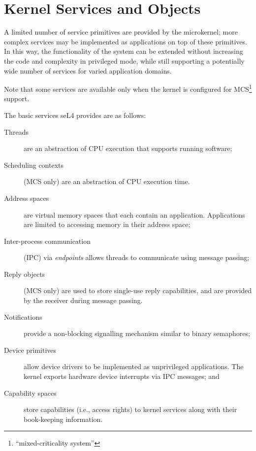 %
%
%

\chapter{\label{ch:objects}Kernel Services and Objects}

A limited number of service primitives are provided by the microkernel;
more complex services may be implemented as applications on top of these
primitives. In this way, the functionality of the system can be extended
without increasing the code and complexity in privileged mode, while
still supporting a potentially wide number of services for varied
application domains.

Note that some services are available only when the kernel is configured for
MCS\footnote{``mixed-criticality system''} support.

The basic services seL4 provides are as follows:
\begin{description}
    \item[Threads] are an abstraction of CPU execution that supports
    running software;

    \item[Scheduling contexts] (MCS only) are an abstraction of CPU execution time.

    \item[Address spaces] are virtual memory spaces that each contain an
    application. Applications are limited to accessing memory in their
    address space;

    \item[Inter-process communication] (IPC) via \emph{endpoints} allows
    threads to communicate using message passing;

    \item[Reply objects] (MCS only) are used to store single-use reply capabilities,
    and are provided by the receiver during message passing.

    \item[Notifications] provide a non-blocking signalling mechanism
      similar to binary semaphores;

    \item[Device primitives] allow device drivers to be implemented as
    unprivileged applications.  The kernel exports hardware device
    interrupts via IPC messages; and

    \item[Capability spaces] store capabilities (i.e., access rights) to
    kernel services along with their book-keeping information.
\end{description}

